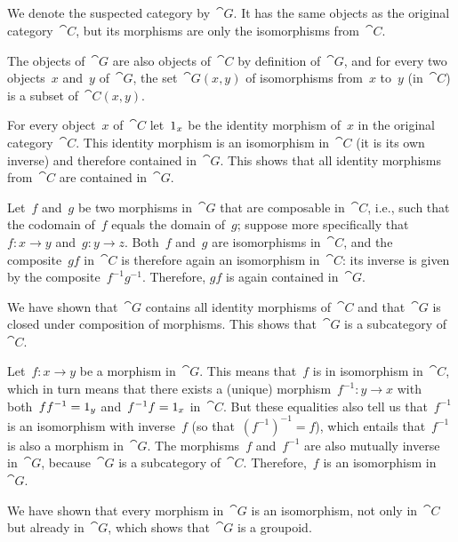 \subsection{}

We denote the suspected category by~$\cat{G}$.
It has the same objects as the original category~$\cat{C}$, but its morphisms are only the isomorphisms from~$\cat{C}$.

The objects of~$\cat{G}$ are also objects of~$\cat{C}$ by definition of~$\cat{G}$, and for every two objects~$x$ and~$y$ of~$\cat{G}$, the set~$\cat{G}(x, y)$ of isomorphisms from~$x$ to~$y$ (in~$\cat{C}$) is a subset of~$\cat{C}(x, y)$.

For every object~$x$ of~$\cat{C}$ let~$1_x$ be the identity morphism of~$x$ in the original category~$\cat{C}$.
This identity morphism is an isomorphism in~$\cat{C}$ (it is its own inverse) and therefore contained in~$\cat{G}$.
This shows that all identity morphisms from~$\cat{C}$ are contained in~$\cat{G}$.

Let~$f$ and~$g$ be two morphisms in~$\cat{G}$ that are composable in~$\cat{C}$, i.e., such that the codomain of~$f$ equals the domain of~$g$;
suppose more specifically that~$f \colon x \to y$ and~$g \colon y \to z$.
Both~$f$ and~$g$ are isomorphisms in~$\cat{C}$, and the composite~$g f$ in~$\cat{C}$ is therefore again an isomorphism in~$\cat{C}$:
its inverse is given by the composite~$f^{-1} g^{-1}$.
Therefore, $g f$ is again contained in~$\cat{G}$.

We have shown that~$\cat{G}$ contains all identity morphisms of~$\cat{C}$ and that~$\cat{G}$ is closed under composition of morphisms.
This shows that~$\cat{G}$ is a subcategory of~$\cat{C}$.

Let~$f \colon x \to y$ be a morphism in~$\cat{G}$.
This means that~$f$ is in isomorphism in~$\cat{C}$, which in turn means that there exists a (unique) morphism~$f^{-1} \colon y \to x$ with both~$f f^{-1} = 1_y$ and~$f^{-1} f = 1_x$ in~$\cat{C}$.
But these equalities also tell us that~$f^{-1}$ is an isomorphism with inverse~$f$ (so that~$(f^{-1})^{-1} = f$), which entails that~$f^{-1}$ is also a morphism in~$\cat{G}$.
The morphisms~$f$ and~$f^{-1}$ are also mutually inverse in~$\cat{G}$, because~$\cat{G}$ is a subcategory of~$\cat{C}$.
Therefore,~$f$ is an isomorphism in~$\cat{G}$.

We have shown that every morphism in~$\cat{G}$ is an isomorphism, not only in~$\cat{C}$ but already in~$\cat{G}$, which shows that~$\cat{G}$ is a groupoid.

